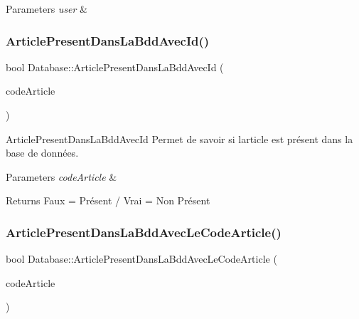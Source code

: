 \begin{DoxyParams}{Parameters}
{\em user} & \\
\hline
\end{DoxyParams}
\mbox{\label{class_database_a84330285ff6131c5d496d9b7d8b277b1}} 
\subsubsection{\texorpdfstring{Article\+Present\+Dans\+La\+Bdd\+Avec\+Id()}{ArticlePresentDansLaBddAvecId()}}
{\footnotesize\ttfamily bool Database\+::\+Article\+Present\+Dans\+La\+Bdd\+Avec\+Id (\begin{DoxyParamCaption}\item[{Q\+String}]{code\+Article }\end{DoxyParamCaption})}



Article\+Present\+Dans\+La\+Bdd\+Avec\+Id Permet de savoir si l\textquotesingle{}article est présent dans la base de données. 


\begin{DoxyParams}{Parameters}
{\em code\+Article} & \\
\hline
\end{DoxyParams}
\begin{DoxyReturn}{Returns}
Faux = Présent / Vrai = Non Présent 
\end{DoxyReturn}
\mbox{\label{class_database_a5965471d637e973abba80f63f6aecb8d}} 
\subsubsection{\texorpdfstring{Article\+Present\+Dans\+La\+Bdd\+Avec\+Le\+Code\+Article()}{ArticlePresentDansLaBddAvecLeCodeArticle()}}
{\footnotesize\ttfamily bool Database\+::\+Article\+Present\+Dans\+La\+Bdd\+Avec\+Le\+Code\+Article (\begin{DoxyParamCaption}\item[{Q\+String}]{code\+Article }\end{DoxyParamCaption})}



